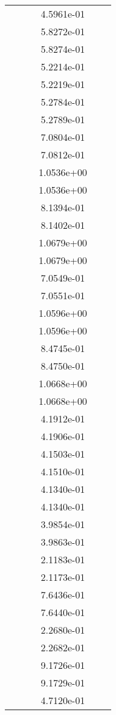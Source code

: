 \begin{xltabular}{\textwidth}{r|rS[table-format=1.3e+2]S[table-format=1.4e+2]S[table-format=1.4e+2]S[table-format=-1.5]}
&  &  & 4.5961e-01 & & \\
&  &  & 5.8272e-01 & & \\
&  &  & 5.8274e-01 & & \\
&  &  & 5.2214e-01 & & \\
&  &  & 5.2219e-01 & & \\
&  &  & 5.2784e-01 & & \\
&  &  & 5.2789e-01 & & \\
&  &  & 7.0804e-01 & & \\
&  &  & 7.0812e-01 & & \\
&  &  & 1.0536e+00 & & \\
&  &  & 1.0536e+00 & & \\
&  &  & 8.1394e-01 & & \\
&  &  & 8.1402e-01 & & \\
&  &  & 1.0679e+00 & & \\
&  &  & 1.0679e+00 & & \\
&  &  & 7.0549e-01 & & \\
&  &  & 7.0551e-01 & & \\
&  &  & 1.0596e+00 & & \\
&  &  & 1.0596e+00 & & \\
&  &  & 8.4745e-01 & & \\
&  &  & 8.4750e-01 & & \\
&  &  & 1.0668e+00 & & \\
&  &  & 1.0668e+00 & & \\
&  &  & 4.1912e-01 & & \\
&  &  & 4.1906e-01 & & \\
&  &  & 4.1503e-01 & & \\
&  &  & 4.1510e-01 & & \\
&  &  & 4.1340e-01 & & \\
&  &  & 4.1340e-01 & & \\
&  &  & 3.9854e-01 & & \\
&  &  & 3.9863e-01 & & \\
&  &  & 2.1183e-01 & & \\
&  &  & 2.1173e-01 & & \\
&  &  & 7.6436e-01 & & \\
&  &  & 7.6440e-01 & & \\
&  &  & 2.2680e-01 & & \\
&  &  & 2.2682e-01 & & \\
&  &  & 9.1726e-01 & & \\
&  &  & 9.1729e-01 & & \\
&  &  & 4.7120e-01 & & \\

\end{xltabular}

